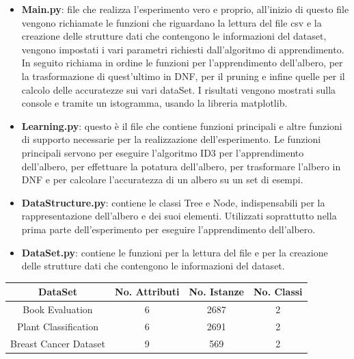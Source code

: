 \documentclass[]{article}
\begin{document}
\begin{itemize}
\item \textbf{Main.py}: file che realizza l'esperimento vero e proprio, all'inizio di questo file vengono richiamate le funzioni che riguardano la lettura del file csv e la creazione delle strutture dati che contengono le informazioni del dataset, vengono impostati i vari parametri richiesti dall'algoritmo di apprendimento.
In seguito richiama in ordine le funzioni per l'apprendimento dell'albero,
per la trasformazione di quest'ultimo in DNF, per il pruning e infine quelle per il calcolo delle accuratezze sui vari dataSet.
I risultati vengono mostrati sulla console e tramite un istogramma, usando la libreria matplotlib.

\item \textbf{Learning.py}: questo è il file che contiene funzioni principali e altre funzioni di supporto necessarie per la realizzazione dell'esperimento.
Le funzioni principali servono per eseguire l'algoritmo ID3 per l'apprendimento dell'albero, per effettuare la potatura dell'albero, per trasformare l'albero in DNF e per calcolare l'accuratezza di un albero su un set di esempi.

\item \textbf{DataStructure.py}: contiene le classi Tree e Node, indispensabili per la rappresentazione dell'albero e dei suoi elementi. Utilizzati soprattutto nella prima parte dell'esperimento per eseguire l'apprendimento dell'albero.

\item \textbf{DataSet.py}: contiene le funzioni per la lettura del file e per la creazione delle strutture dati che contengono le informazioni del dataset.

\end{itemize}

\begin{center}
\begin{tabular}{|c|c|c|c|}
\hline
DataSet & No. Attributi & No. Istanze & No. Classi\\
\hline
Book Evaluation & 6 & 2687 & 2 \\
\hline
Plant Classification & 6 & 2691 & 2 \\
\hline
Breast Cancer Dataset & 9 & 569 & 2 \\
\hline
\end{tabular}
\end{center}

\newpage
\end{document}
